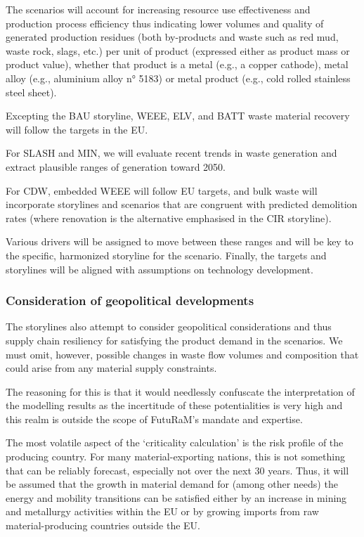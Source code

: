 The scenarios will account for increasing resource use effectiveness and production process efficiency thus indicating lower volumes and quality of generated production residues (both by-products and waste such as red mud, waste rock, slags, etc.) per unit of product (expressed either as product mass or product value), whether that product is a metal (e.g., a copper cathode), metal alloy (e.g., aluminium alloy n° 5183) or metal product (e.g., cold rolled stainless steel sheet).

Excepting the BAU storyline, WEEE, ELV, and BATT waste material recovery will follow the targets in the EU.\@

For SLASH and MIN, we will evaluate recent trends in waste generation and extract plausible ranges of generation toward 2050.

For CDW, embedded WEEE will follow EU targets, and bulk waste will incorporate storylines and scenarios that are congruent with predicted demolition rates (where renovation is the alternative emphasised in the CIR storyline).

Various drivers will be assigned to move between these ranges and will be key to the specific, harmonized storyline for the scenario. Finally, the targets and storylines will be aligned with assumptions on technology development.



\subsubsection{Consideration of geopolitical developments}

The storylines also attempt to consider geopolitical considerations and thus supply chain resiliency for satisfying the product demand in the scenarios. We must omit, however, possible changes in waste flow volumes and composition that could arise from any material supply constraints.

The reasoning for this is that it would needlessly confuscate the interpretation of the modelling results as the incertitude of these potentialities is very high and this realm is outside the scope of FutuRaM's mandate and expertise.


The most volatile aspect of the `criticality calculation' is the risk profile of the producing country. For many material-exporting nations, this is not something that can be reliably forecast, especially not over the next 30 years. Thus, it will be assumed that the growth in material demand for (among other needs) the energy and mobility transitions can be satisfied either by an increase in mining and metallurgy activities within the EU or by growing imports from raw material-producing countries outside the EU.\@


